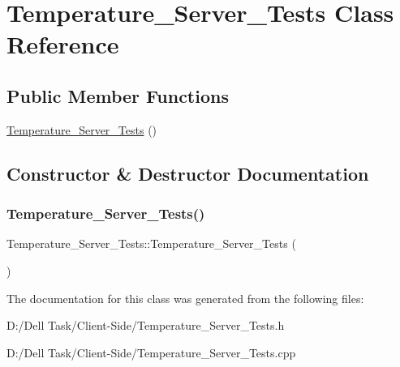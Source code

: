\hypertarget{class_temperature___server___tests}{}\section{Temperature\+\_\+\+Server\+\_\+\+Tests Class Reference}
\label{class_temperature___server___tests}
\subsection*{Public Member Functions}
\begin{DoxyCompactItemize}
\item 
\mbox{\hyperlink{class_temperature___server___tests_a2f79ed454ebd677befa6b0772cac7613}{Temperature\+\_\+\+Server\+\_\+\+Tests}} ()
\end{DoxyCompactItemize}


\subsection{Constructor \& Destructor Documentation}
\mbox{\label{class_temperature___server___tests_a2f79ed454ebd677befa6b0772cac7613}} 
\subsubsection{\texorpdfstring{Temperature\+\_\+\+Server\+\_\+\+Tests()}{Temperature\_Server\_Tests()}}
{\footnotesize\ttfamily Temperature\+\_\+\+Server\+\_\+\+Tests\+::\+Temperature\+\_\+\+Server\+\_\+\+Tests (\begin{DoxyParamCaption}{ }\end{DoxyParamCaption})}







The documentation for this class was generated from the following files\+:\begin{DoxyCompactItemize}
\item 
D\+:/\+Dell Task/\+Client-\/\+Side/Temperature\+\_\+\+Server\+\_\+\+Tests.\+h\item 
D\+:/\+Dell Task/\+Client-\/\+Side/Temperature\+\_\+\+Server\+\_\+\+Tests.\+cpp\end{DoxyCompactItemize}
